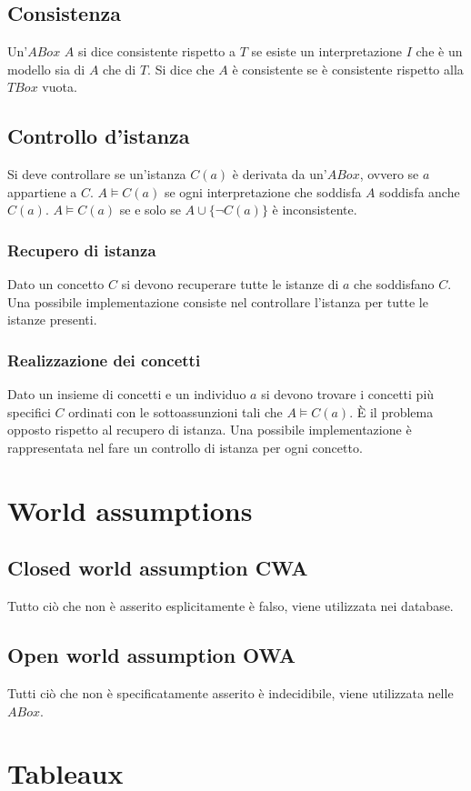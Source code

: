 \subsection{Consistenza}
Un'$ABox$ $A$ si dice consistente rispetto a $T$ se esiste un interpretazione $I$ che \`e un modello sia di $A$ che di $T$. Si dice che $A$ \`e consistente se \`e consistente rispetto alla $TBox$ vuota.
\subsection{Controllo d'istanza}
Si deve controllare se un'istanza $C(a)$ \`e derivata da un'$ABox$, ovvero se $a$ appartiene a $C$. $A\models C(a)$ se ogni interpretazione che soddisfa $A$ soddisfa anche $C(a)$. $A\models C(a)$ se e 
solo se $A\cup\{\neg C(a)\}$ \`e inconsistente. 
\subsubsection{Recupero di istanza}
Dato un concetto $C$ si devono recuperare tutte le istanze di $a$ che soddisfano $C$. Una possibile implementazione consiste nel controllare l'istanza per tutte le istanze presenti.
\subsubsection{Realizzazione dei concetti}
Dato un insieme di concetti e un individuo $a$ si devono trovare i concetti pi\`u specifici $C$ ordinati con le sottoassunzioni tali che $A\models C(a)$. \`E il problema opposto rispetto al recupero di istanza. Una
possibile implementazione \`e rappresentata nel fare un controllo di istanza per ogni concetto.
\section{World assumptions}
\subsection{Closed world assumption CWA}
Tutto ci\`o che non \`e asserito esplicitamente \`e falso, viene utilizzata nei database.
\subsection{Open world assumption OWA}
Tutti ci\`o che non \`e specificatamente asserito \`e indecidibile, viene utilizzata nelle $ABox$.
\section{Tableaux}

